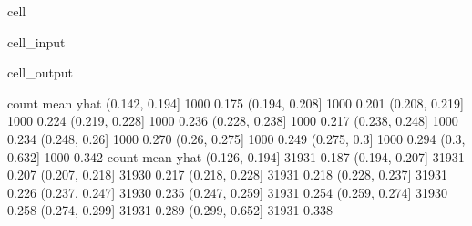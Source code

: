 \documentclass[letterpaper,10pt,english]{jupyterBook}
\begin{document}
\begin{sphinxuseclass}{cell}\begin{sphinxVerbatimInput}

\begin{sphinxuseclass}{cell_input}
\begin{sphinxVerbatim}[commandchars=\\\{\}]
 
 
\end{sphinxVerbatim}

\end{sphinxuseclass}\end{sphinxVerbatimInput}
\begin{sphinxVerbatimOutput}

\begin{sphinxuseclass}{cell_output}
\begin{sphinxVerbatim}[commandchars=\\\{\}]
                count  mean
yhat                       
(0.142, 0.194]   1000 0.175
(0.194, 0.208]   1000 0.201
(0.208, 0.219]   1000 0.224
(0.219, 0.228]   1000 0.236
(0.228, 0.238]   1000 0.217
(0.238, 0.248]   1000 0.234
(0.248, 0.26]    1000 0.270
(0.26, 0.275]    1000 0.249
(0.275, 0.3]     1000 0.294
(0.3, 0.632]     1000 0.342
                count  mean
yhat                       
(0.126, 0.194]  31931 0.187
(0.194, 0.207]  31931 0.207
(0.207, 0.218]  31930 0.217
(0.218, 0.228]  31931 0.218
(0.228, 0.237]  31931 0.226
(0.237, 0.247]  31930 0.235
(0.247, 0.259]  31931 0.254
(0.259, 0.274]  31930 0.258
(0.274, 0.299]  31931 0.289
(0.299, 0.652]  31931 0.338
\end{sphinxVerbatim}

\noindent{}

\end{sphinxuseclass}\end{sphinxVerbatimOutput}

\end{sphinxuseclass}
\end{document}
